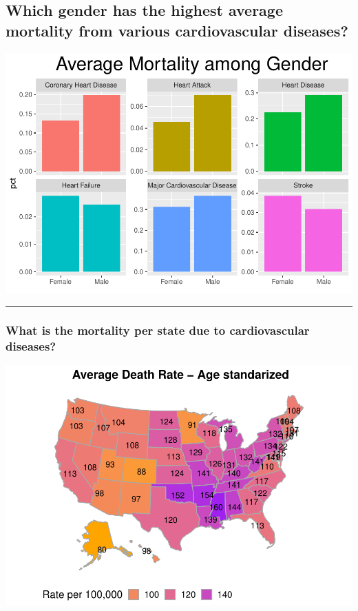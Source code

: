 \documentclass[]{article}
\begin{document}
\hypertarget{which-gender-has-the-highest-average-mortality-from-various-cardiovascular-diseases}{%
\subsection{Which gender has the highest average mortality from various
cardiovascular
diseases?}\label{which-gender-has-the-highest-average-mortality-from-various-cardiovascular-diseases}}

\includegraphics{final_project_files/figure-latex/GenderMortality-1.pdf}

\begin{center}\rule{0.5\linewidth}{\linethickness}\end{center}

\hypertarget{what-is-the-mortality-per-state-due-to-cardiovascular-diseases}{%
\subsubsection{What is the mortality per state due to cardiovascular
diseases?}\label{what-is-the-mortality-per-state-due-to-cardiovascular-diseases}}

\includegraphics{final_project_files/figure-latex/mapUSAvgDeathRate-1.pdf}
\end{document}
